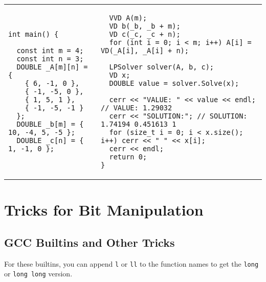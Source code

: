 \documentclass[letterpaper]{article}
\begin{document}
\begin{tabular}{@{}p{9cm}p{9cm}@{}}
\begin{lstlisting}
int main() {

  const int m = 4;
  const int n = 3;
  DOUBLE _A[m][n] = {
    { 6, -1, 0 },
    { -1, -5, 0 },
    { 1, 5, 1 },
    { -1, -5, -1 }
  };
  DOUBLE _b[m] = { 10, -4, 5, -5 };
  DOUBLE _c[n] = { 1, -1, 0 };
\end{lstlisting}
&
\begin{lstlisting}
  VVD A(m);
  VD b(_b, _b + m);
  VD c(_c, _c + n);
  for (int i = 0; i < m; i++) A[i] = VD(_A[i], _A[i] + n);

  LPSolver solver(A, b, c);
  VD x;
  DOUBLE value = solver.Solve(x);

  cerr << "VALUE: " << value << endl; // VALUE: 1.29032
  cerr << "SOLUTION:"; // SOLUTION: 1.74194 0.451613 1
  for (size_t i = 0; i < x.size(); i++) cerr << " " << x[i];
  cerr << endl;
  return 0;
}
\end{lstlisting}
\end{tabular}

\clearpage

\section{Tricks for Bit Manipulation}

\subsection{GCC Builtins and Other Tricks}

For these builtins, you can append \texttt{l} or \texttt{ll} to the function names to get the \texttt{long} or \texttt{long long} version.
\end{document}
